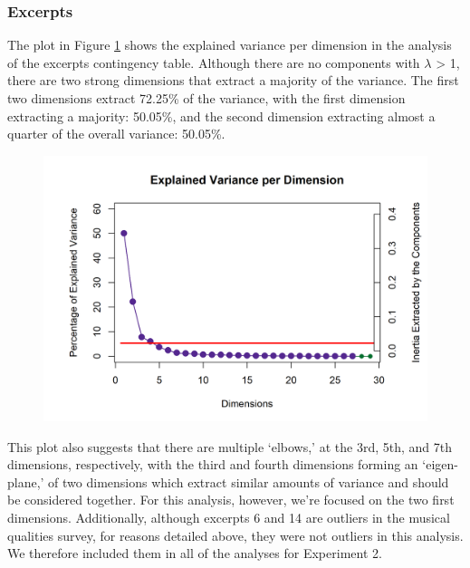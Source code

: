 \documentclass[
  english,
  man,floatsintext]{apa6}
\begin{document}
\hypertarget{excerpts-1}{%
\subsubsection{Excerpts}\label{excerpts-1}}

The plot in Figure \ref{fig:scree4descriptors} shows the explained variance per dimension in the analysis of the excerpts contingency table. Although there are no components with \(\lambda\) \textgreater{} 1, there are two strong dimensions that extract a majority of the variance. The first two dimensions extract 72.25\% of the variance, with the first dimension extracting a majority: 50.05\%, and the second dimension extracting almost a quarter of the overall variance: 50.05\%.

\begin{figure}  
  \begin{center}
    \includegraphics{./Music-Descriptor-Space_files/figure-latex/scree4descriptors-1.png}
  \caption{ }\label{fig:scree4descriptors}  
 \end{center}
\end{figure}

This plot also suggests that there are multiple `elbows,' at the 3rd, 5th, and 7th dimensions, respectively, with the third and fourth dimensions forming an `eigen-plane,' of two dimensions which extract similar amounts of variance and should be considered together. For this analysis, however, we're focused on the two first dimensions. Additionally, although excerpts 6 and 14 are outliers in the musical qualities survey, for reasons detailed above, they were not outliers in this analysis. We therefore included them in all of the analyses for Experiment 2.
\end{document}
